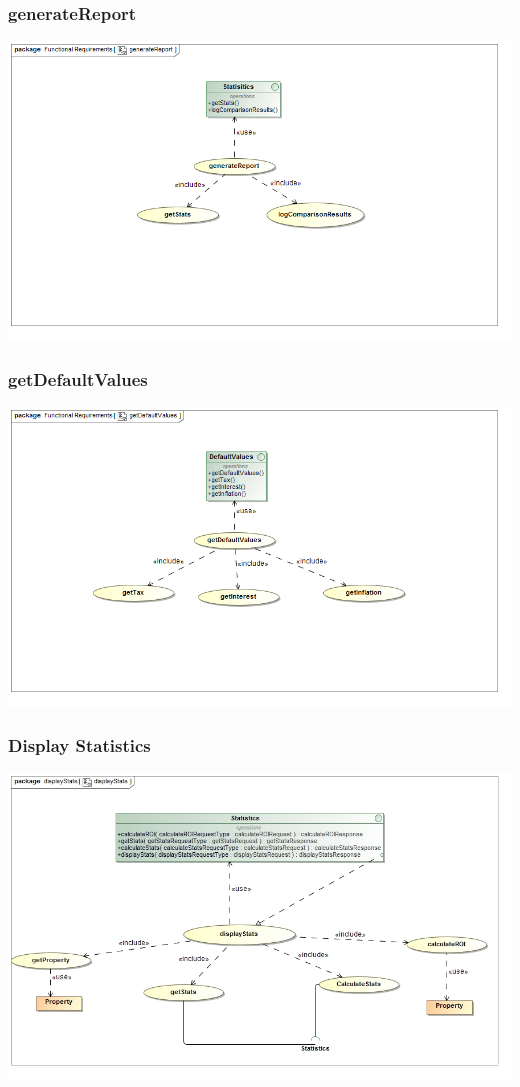 \documentclass[a4paper,12pt]{article}
\begin{document}
\subsubsection{generateReport}
\includegraphics[width=1\textwidth]{./Images/requiredFunctionality/generateReport.png}
\subsubsection{getDefaultValues}
\includegraphics[width=1\textwidth]{./Images/requiredFunctionality/getDefaultValues.png}

\subsubsection{Display Statistics}
\includegraphics[width=1\textwidth]{./Images/requiredFunctionality/displayStatsUseCase.jpg}
\end{document}
